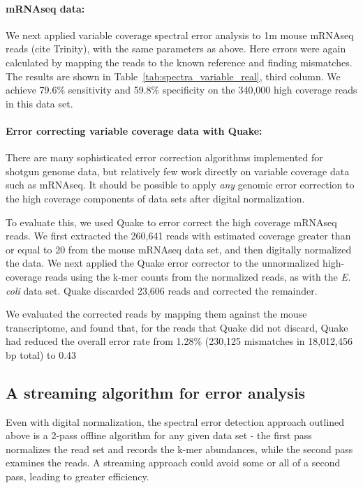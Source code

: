 \documentclass{article}
\begin{document}
\paragraph{mRNAseq data:}


We next applied variable coverage spectral error analysis to 1m mouse
mRNAseq reads (cite Trinity), with the same parameters as above.  Here
errors were again calculated by mapping the reads to the known
reference and finding mismatches. The results are shown in
Table~\ref{tab:spectra_variable_real}, third column.  We achieve
79.6\% sensitivity and 59.8\% specificity on the 340,000 high coverage
reads in this data set.

\paragraph{Error correcting variable coverage data with Quake:}


There are many sophisticated error correction algorithms implemented
for shotgun genome data, but relatively few work directly on variable
coverage data such as mRNAseq.  It should be possible to apply {\em
  any} genomic error correction to the high coverage components of
data sets after digital normalization.

To evaluate this, we used Quake to error correct the high coverage
mRNAseq reads.  We first extracted the 260,641 reads with estimated
coverage greater than or equal to 20 from the mouse mRNAseq data set,
and then digitally normalized the data.  We next applied the Quake
error corrector to the unnormalized high-coverage reads using the
k-mer counts from the normalized reads, as with the {\em E. coli} data
set.  Quake discarded 23,606 reads and corrected the remainder.

We evaluated the corrected reads by mapping them against the mouse
transcriptome, and found that, for the reads that Quake did not discard,
Quake had reduced the overall
error rate from 1.28\% (230,125 mismatches in 18,012,456 bp total) to
0.43%

\subsection{A streaming algorithm for error analysis}

Even with digital normalization, the spectral error detection approach
outlined above is a 2-pass offline algorithm for any given data set -
the first pass normalizes the read set and records the k-mer
abundances, while the second pass examines the reads.  A streaming
approach could avoid some or all of a second pass, leading to
greater efficiency.
\end{document}
